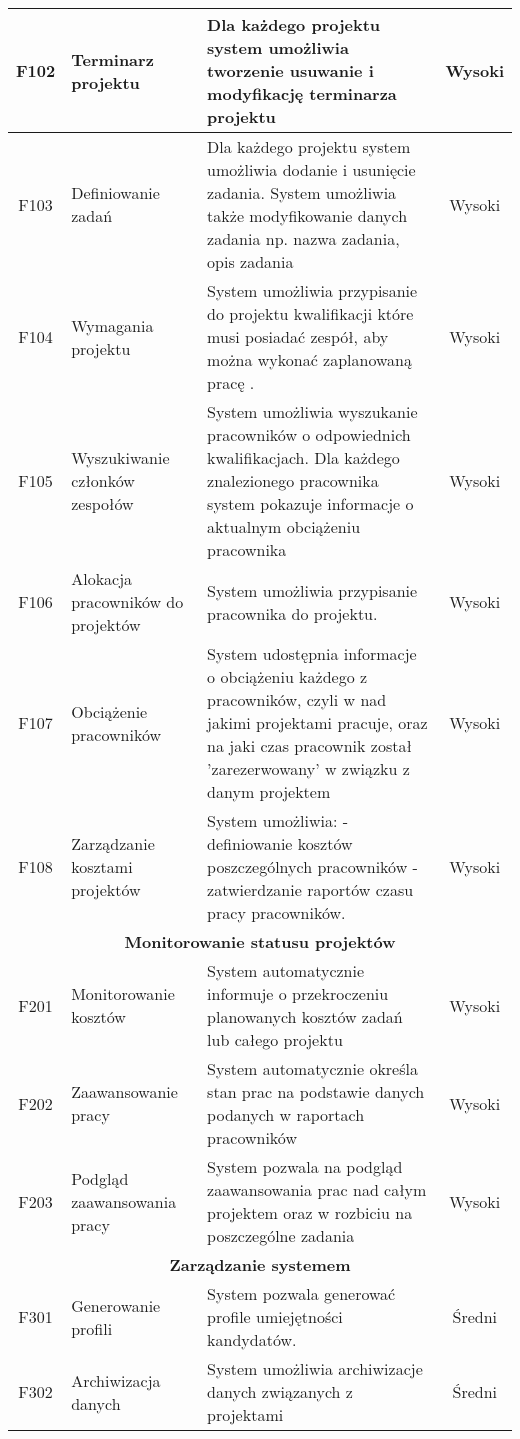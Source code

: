 \begin{tabularx}{\textwidth}{|c|X|X|c|}
\hline
F102 & Terminarz projektu & Dla każdego projektu system umożliwia tworzenie usuwanie i modyfikację terminarza projektu & Wysoki \\
\hline 
F103 & Definiowanie zadań & Dla każdego projektu system umożliwia dodanie i usunięcie zadania. System umożliwia także modyfikowanie danych zadania np. nazwa zadania, opis zadania & Wysoki \\ 
\hline 
F104 & Wymagania projektu & System umożliwia przypisanie do projektu kwalifikacji które musi posiadać zespół, aby można wykonać zaplanowaną pracę . & Wysoki \\ 
\hline 
F105 & Wyszukiwanie członków zespołów & System umożliwia wyszukanie pracowników o odpowiednich kwalifikacjach. Dla każdego znalezionego pracownika system pokazuje informacje o aktualnym obciążeniu pracownika& Wysoki \\ 
\hline 
F106 & Alokacja pracowników do projektów & System umożliwia przypisanie pracownika do projektu. & Wysoki \\ 
\hline 
F107 & Obciążenie pracowników & System udostępnia informacje o obciążeniu każdego z pracowników, czyli w nad jakimi projektami pracuje, oraz na jaki czas pracownik został 'zarezerwowany' w związku z danym projektem & Wysoki \\ 
\hline 
F108 & Zarządzanie kosztami projektów & System umożliwia: \newline
- definiowanie kosztów poszczególnych pracowników \newline
- zatwierdzanie raportów czasu pracy pracowników. & Wysoki \\
\hline
\multicolumn{4}{|c|}{\textbf{Monitorowanie statusu projektów}} \\
\hline 
F201 & Monitorowanie kosztów & System automatycznie informuje o przekroczeniu planowanych kosztów zadań lub całego projektu & Wysoki \\ 
\hline 
F202 & Zaawansowanie pracy & System automatycznie określa stan prac na podstawie danych podanych w raportach pracowników & Wysoki \\
\hline 
F203 & Podgląd zaawansowania pracy & System pozwala na podgląd zaawansowania prac nad całym projektem oraz w rozbiciu na poszczególne zadania & Wysoki \\
\hline 
\multicolumn{4}{|c|}{\textbf{Zarządzanie systemem}} \\
\hline 
F301 & Generowanie profili & System pozwala generować profile umiejętności kandydatów.  & Średni \\ 
\hline
F302 & Archiwizacja danych & System umożliwia archiwizacje danych związanych z projektami & Średni \\ 
\hline

\end{tabularx} 

